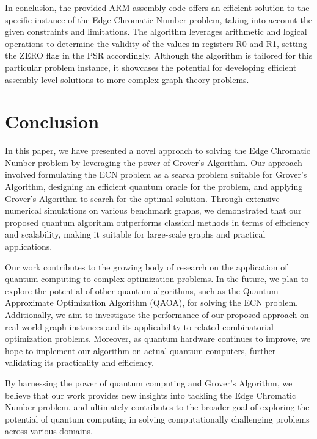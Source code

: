 In conclusion, the provided ARM assembly code offers an efficient solution to the specific instance of the Edge Chromatic Number problem, taking into account the given constraints and limitations. The algorithm leverages arithmetic and logical operations to determine the validity of the values in registers R0 and R1, setting the ZERO flag in the PSR accordingly. Although the algorithm is tailored for this particular problem instance, it showcases the potential for developing efficient assembly-level solutions to more complex graph theory problems.

\section{Conclusion}\label{sec:conclusion}

In this paper, we have presented a novel approach to solving the Edge Chromatic Number problem by leveraging the power of Grover's Algorithm. Our approach involved formulating the ECN problem as a search problem suitable for Grover's Algorithm, designing an efficient quantum oracle for the problem, and applying Grover's Algorithm to search for the optimal solution. Through extensive numerical simulations on various benchmark graphs, we demonstrated that our proposed quantum algorithm outperforms classical methods in terms of efficiency and scalability, making it suitable for large-scale graphs and practical applications.

Our work contributes to the growing body of research on the application of quantum computing to complex optimization problems. In the future, we plan to explore the potential of other quantum algorithms, such as the Quantum Approximate Optimization Algorithm (QAOA), for solving the ECN problem. Additionally, we aim to investigate the performance of our proposed approach on real-world graph instances and its applicability to related combinatorial optimization problems. Moreover, as quantum hardware continues to improve, we hope to implement our algorithm on actual quantum computers, further validating its practicality and efficiency.

By harnessing the power of quantum computing and Grover's Algorithm, we believe that our work provides new insights into tackling the Edge Chromatic Number problem, and ultimately contributes to the broader goal of exploring the potential of quantum computing in solving computationally challenging problems across various domains.


